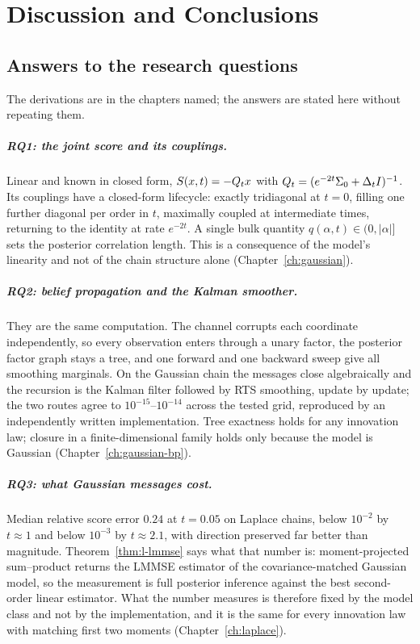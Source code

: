 \chapter{Discussion and Conclusions}\label{ch:conclusions}

\section{Answers to the research questions}\label{sec:conclusions-findings}

The derivations are in the chapters named; the answers are stated here without
repeating them.

\paragraph{RQ1: the joint score and its couplings.} Linear and known in closed
form, $S(x,t) = -Q_t x$ with $Q_t = (e^{-2t}\Sigma_0 + \Delta_t I)^{-1}$. Its
couplings have a closed-form lifecycle: exactly tridiagonal at $t=0$, filling
one further diagonal per order in $t$, maximally coupled at intermediate times,
returning to the identity at rate $e^{-2t}$. A single bulk quantity
$q(\alpha,t) \in (0,|\alpha|]$ sets the posterior correlation length. This is a
consequence of the model's linearity and not of the chain structure alone
(Chapter~\ref{ch:gaussian}).

\paragraph{RQ2: belief propagation and the Kalman smoother.} They are the same
computation. The channel corrupts each coordinate independently, so every
observation enters through a unary factor, the posterior factor graph stays a
tree, and one forward and one backward sweep give all smoothing marginals. On
the Gaussian chain the messages close algebraically and the recursion is the
Kalman filter followed by RTS smoothing, update by update; the two routes agree
to $10^{-15}$--$10^{-14}$ across the tested grid, reproduced by an independently
written implementation. Tree exactness holds for any innovation law; closure in
a finite-dimensional family holds only because the model is Gaussian
(Chapter~\ref{ch:gaussian-bp}).

\paragraph{RQ3: what Gaussian messages cost.} Median relative score error
$0.24$ at $t=0.05$ on Laplace chains, below $10^{-2}$ by $t \approx 1$ and
below $10^{-3}$ by $t \approx 2.1$, with direction preserved far better than
magnitude. Theorem~\ref{thm:l-lmmse} says what that number is: moment-projected
sum--product returns the LMMSE estimator of the covariance-matched Gaussian
model, so the measurement is full posterior inference against the best
second-order linear estimator. What the number measures is therefore fixed by
the model class and not by the implementation, and it is the same for every
innovation law with matching first two moments (Chapter~\ref{ch:laplace}).

